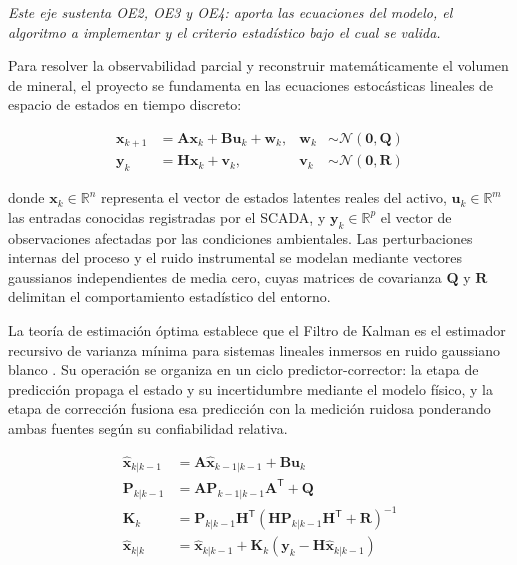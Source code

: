 \emph{Este eje sustenta OE2, OE3 y OE4: aporta las ecuaciones del modelo, el
algoritmo a implementar y el criterio estadístico bajo el cual se valida.}

Para resolver la observabilidad parcial y reconstruir matemáticamente el volumen
de mineral, el proyecto se fundamenta en las ecuaciones estocásticas lineales de
espacio de estados en tiempo discreto:

\begin{align}
\mathbf{x}_{k+1} &= \mathbf{A}\mathbf{x}_{k} + \mathbf{B}\mathbf{u}_{k}
                    + \mathbf{w}_{k}, & \mathbf{w}_{k} &\sim
                    \mathcal{N}(\mathbf{0}, \mathbf{Q}) \label{eq:estado}\\
\mathbf{y}_{k}   &= \mathbf{H}\mathbf{x}_{k} + \mathbf{v}_{k}, &
                    \mathbf{v}_{k} &\sim \mathcal{N}(\mathbf{0}, \mathbf{R})
                    \label{eq:medicion}
\end{align}

donde $\mathbf{x}_{k} \in \mathbb{R}^{n}$ representa el vector de estados
latentes reales del activo, $\mathbf{u}_{k} \in \mathbb{R}^{m}$ las entradas
conocidas registradas por el SCADA, y $\mathbf{y}_{k} \in \mathbb{R}^{p}$ el
vector de observaciones afectadas por las condiciones ambientales. Las
perturbaciones internas del proceso y el ruido instrumental se modelan mediante
vectores gaussianos independientes de media cero, cuyas matrices de covarianza
$\mathbf{Q}$ y $\mathbf{R}$ delimitan el comportamiento estadístico del entorno.

La teoría de estimación óptima establece que el Filtro de Kalman es el estimador
recursivo de varianza mínima para sistemas lineales inmersos en ruido gaussiano
blanco \parencite{kalman1960,simon2006}. Su operación se organiza en un ciclo
predictor-corrector: la etapa de predicción propaga el estado y su incertidumbre
mediante el modelo físico, y la etapa de corrección fusiona esa predicción con
la medición ruidosa ponderando ambas fuentes según su confiabilidad relativa.

\begin{align}
\hat{\mathbf{x}}_{k|k-1} &= \mathbf{A}\hat{\mathbf{x}}_{k-1|k-1}
                            + \mathbf{B}\mathbf{u}_{k} \label{eq:pred-x}\\
\mathbf{P}_{k|k-1} &= \mathbf{A}\mathbf{P}_{k-1|k-1}\mathbf{A}^{\mathsf{T}}
                      + \mathbf{Q} \label{eq:pred-P}\\
\mathbf{K}_{k} &= \mathbf{P}_{k|k-1}\mathbf{H}^{\mathsf{T}}
                  \left(\mathbf{H}\mathbf{P}_{k|k-1}\mathbf{H}^{\mathsf{T}}
                  + \mathbf{R}\right)^{-1} \label{eq:ganancia}\\
\hat{\mathbf{x}}_{k|k} &= \hat{\mathbf{x}}_{k|k-1}
                          + \mathbf{K}_{k}\left(\mathbf{y}_{k}
                          - \mathbf{H}\hat{\mathbf{x}}_{k|k-1}\right)
                          \label{eq:corr-x}
\end{align}

